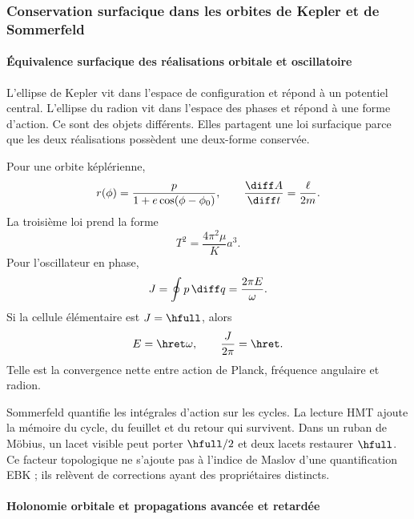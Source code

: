 \subsubsection{Conservation surfacique dans les orbites de Kepler et de Sommerfeld}

\paragraph{Équivalence surfacique des réalisations orbitale et oscillatoire}

L'ellipse de Kepler vit dans l'espace de configuration et répond à un potentiel
central. L'ellipse du radion vit dans l'espace des phases et répond à une forme
d'action. Ce sont des objets différents. Elles partagent une loi surfacique parce que les deux
réalisations possèdent une deux-forme conservée.

Pour une orbite képlérienne,
\begin{equation}
r(\phi)=\frac{p}{1+e\cos(\phi-\phi_0)},
\qquad
\frac{\diff A}{\diff t}=\frac{\ell}{2m}.
\label{eq:kepler}
\end{equation}
La troisième loi prend la forme
\[
T^2=\frac{4\pi^2\mu}{K}a^3.
\]
Pour l'oscillateur en phase,
\begin{equation}
J=\oint p\,\diff q=\frac{2\pi E}{\omega}.
\label{eq:osc-action}
\end{equation}
Si la cellule élémentaire est \(J=\hfull\), alors
\begin{equation}
E=\hret\omega,\qquad \frac{J}{2\pi}=\hret.
\label{eq:E-hbarw}
\end{equation}
Telle est la convergence nette entre action de Planck, fréquence angulaire et
radion.

Sommerfeld quantifie les intégrales d'action sur les cycles. La lecture HMT ajoute
la mémoire du cycle, du feuillet et du retour qui survivent. Dans un ruban de Möbius,
un lacet visible peut porter \(\hfull/2\) et deux lacets restaurer \(\hfull\).
Ce facteur topologique ne s'ajoute pas à l'indice de Maslov d'une quantification EBK ;
ils relèvent de corrections ayant des propriétaires distincts.

\paragraph{Holonomie orbitale et propagations avancée et retardée}

